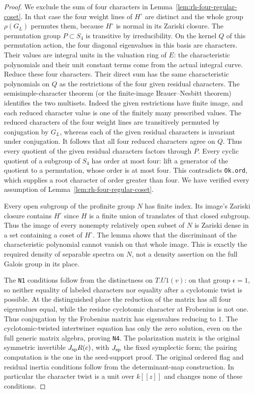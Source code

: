 \begin{proof}
We exclude the sum of four characters in
Lemma~\ref{lem:rh-four-regular-coset}. In that case the
four weight lines of $H^\circ$ are distinct and the
whole group $\rho(G_L)$ permutes them, because
$H^\circ$ is normal in its Zariski closure. The
permutation group $P\subset S_4$ is transitive by
irreducibility. On the kernel $Q$ of this permutation
action, the four diagonal eigenvalues in this basis
are characters. Their values are integral units in
the valuation ring of $E$: the characteristic
polynomials and their unit constant terms come from
the actual integral curve. Reduce these four
characters. Their direct sum has the same
characteristic polynomials on $Q$ as the restrictions
of the four given residual characters. The
semisimple-character theorem (or the finite-image
Brauer--Nesbitt theorem) identifies the two multisets.
Indeed the given restrictions have finite image,
and each reduced character value is one of the
finitely many prescribed values. The reduced
characters of the four weight lines are transitively
permuted by conjugation by $G_L$, whereas each of
the given residual characters is invariant under
conjugation. It follows that all four reduced
characters agree on $Q$. Thus every quotient of the
given residual characters factors through $P$.
Every cyclic quotient of a subgroup of $S_4$ has
order at most four: lift a generator of the quotient
to a permutation, whose order is at most four.
This contradicts \texttt{Ok.ord}, which supplies a
root character of order greater than four.
We have verified every assumption of
Lemma~\ref{lem:rh-four-regular-coset}.

Every open subgroup of the profinite group $N$ has
finite index. Its image's Zariski closure contains
$H^\circ$ since $H$ is a finite union of translates
of that closed subgroup. Thus the image of every
nonempty relatively open subset of $N$ is Zariski
dense in a set containing a coset of $H^\circ$.
The lemma shows that the discriminant of the
characteristic polynomial cannot vanish on that
whole image. This is exactly the required density
of separable spectra on $N$, not a density assertion
on the full Galois group in its place.

The \texttt{N1} conditions follow from the distinctness
on $T.U1(v)$: on that group $\epsilon=1$, so neither
equality of labeled characters nor equality after a
cyclotomic twist is possible. At the distinguished
place the reduction of the matrix has all four
eigenvalues equal, while the residue cyclotomic
character at Frobenius is not one. Thus conjugation
by the Frobenius matrix has eigenvalues reducing to
$1$. The cyclotomic-twisted intertwiner equation has
only the zero solution, even on the full generic
matrix algebra, proving \texttt{N4}. The polarization
matrix is the original symmetric invertible
$J_{\rm sp}R(c)$, with $J_{\rm sp}$ the fixed
symplectic form; the pairing computation is the one
in the seed-support proof. The original ordered
flag and residual inertia conditions follow from
the determinant-map construction. In particular
the character twist is a unit over $k[[z]]$ and
changes none of these conditions.


\end{proof}

